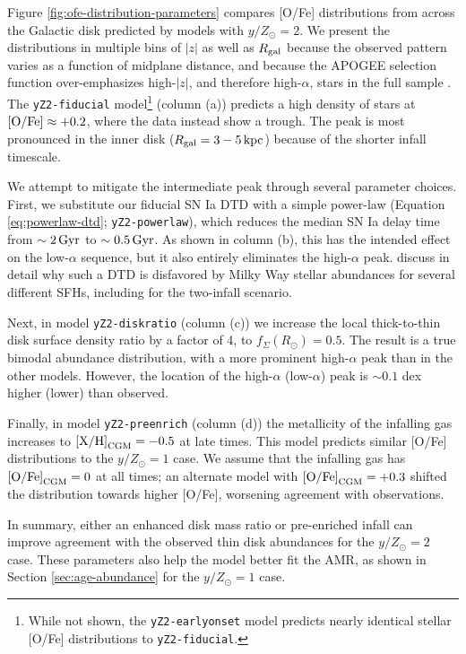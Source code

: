 \documentclass[twocolumn,twocolappendix]{aastex701}
\newcommand{\mathXH}{{\rm [X/H]}}
\newcommand{\mathOFe}{{\rm [O/Fe]}}
\newcommand{\yZ}[1]{$y/Z_\odot=#1$}
\newcommand{\kpc}{\,{\rm kpc}}
\begin{document}
Figure \ref{fig:ofe-distribution-parameters} compares [O/Fe] distributions from across the Galactic disk predicted by models with \yZ{2}. We present the distributions in multiple bins of $|z|$ as well as $R_{\rm gal}$ because the observed pattern varies as a function of midplane distance, and because the APOGEE selection function over-emphasizes high-$|z|$, and therefore high-$\alpha$, stars in the full sample \citep[see Figure 5 from][]{vincenzo_distribution_2021}. The {\tt yZ2-fiducial} model\footnote{While not shown, the {\tt yZ2-earlyonset} model predicts nearly identical stellar [O/Fe] distributions to {\tt yZ2-fiducial}.} (column (a)) predicts a high density of stars at $\mathOFe\approx+0.2$, where the data instead show a trough. The peak is most pronounced in the inner disk ($R_{\rm gal}=3-5\kpc$) because of the shorter infall timescale.

We attempt to mitigate the intermediate peak through several parameter choices. First, we substitute our fiducial SN Ia DTD with a simple power-law (Equation \ref{eq:powerlaw-dtd}; {\tt yZ2-powerlaw}),
which reduces the median SN Ia delay time from $\sim2\,{\rm Gyr}$ to $\sim0.5\,{\rm Gyr}$. As shown in column (b), this has the intended effect on the low-$\alpha$ sequence, but it also entirely eliminates the high-$\alpha$ peak. \citet{dubay_galactic_2024} discuss in detail why such a DTD is disfavored by Milky Way stellar abundances for several different SFHs, including for the two-infall scenario. 

Next, in model {\tt yZ2-diskratio} (column (c)) we increase the local thick-to-thin disk surface density ratio by a factor of 4, to $f_\Sigma(R_\odot)=0.5$. The result is a true bimodal abundance distribution, with a more prominent high-$\alpha$ peak than in the other models. However, the location of the high-$\alpha$ (low-$\alpha$) peak is $\sim0.1$ dex higher (lower) than observed.

Finally, in model {\tt yZ2-preenrich} (column (d)) the metallicity of the infalling gas increases to $\mathXH_{\rm CGM}=-0.5$ at late times. This model predicts similar [O/Fe] distributions to the $y/Z_\odot=1$ case. We assume that the infalling gas has $\mathOFe_{\rm CGM}=0$ at all times; an alternate model with $\mathOFe_{\rm CGM}=+0.3$ shifted the distribution towards higher [O/Fe], worsening agreement with observations. 

In summary, either an enhanced disk mass ratio or pre-enriched infall can improve agreement with the observed thin disk abundances for the \yZ{2} case. These parameters also help the model better fit the AMR, as shown in Section \ref{sec:age-abundance} for the \yZ{1} case.
\end{document}
